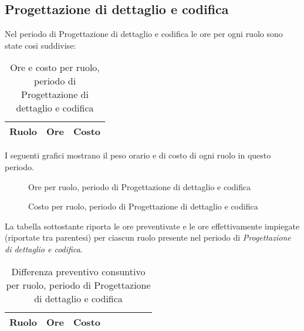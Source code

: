 \subsection{Progettazione di dettaglio e codifica}

Nel periodo di Progettazione di dettaglio e codifica le ore per ogni ruolo sono state cosi suddivise:

\begin{table}[H]
	\centering
	\begin{tabular}{ l c c }
	\textbf{Ruolo} & \textbf{Ore} & \textbf{Costo} \\
	\hline
	
		
	
	\end{tabular}
	\caption{Ore e costo per ruolo, periodo di Progettazione di dettaglio e codifica}
	\end{table}

I seguenti grafici mostrano il peso orario e di costo di ogni ruolo in questo periodo.

\begin{figure}[H]
\begin{tikzpicture}

	

\end{tikzpicture}
\caption{Ore per ruolo, periodo di Progettazione di dettaglio e codifica}
\end{figure}

\begin{figure}[H]
\begin{tikzpicture}

	

\end{tikzpicture}
\caption{Costo per ruolo, periodo di Progettazione di dettaglio e codifica}
\end{figure}

La tabella sottostante riporta le ore preventivate e le ore effettivamente impiegate (riportate tra parentesi) per ciascun ruolo presente nel periodo di \textit{Progettazione di dettaglio e codifica}.

\begin{table}[H]
\centering
\begin{tabular}{lccccccc}
\toprule
    \textbf{Ruolo}  & \textbf{Ore} & \textbf{Costo} \\
    \midrule
    
    	
    
    \bottomrule
\end{tabular}
\caption{Differenza preventivo consuntivo per ruolo, periodo di Progettazione di dettaglio e codifica}
\end{table}

